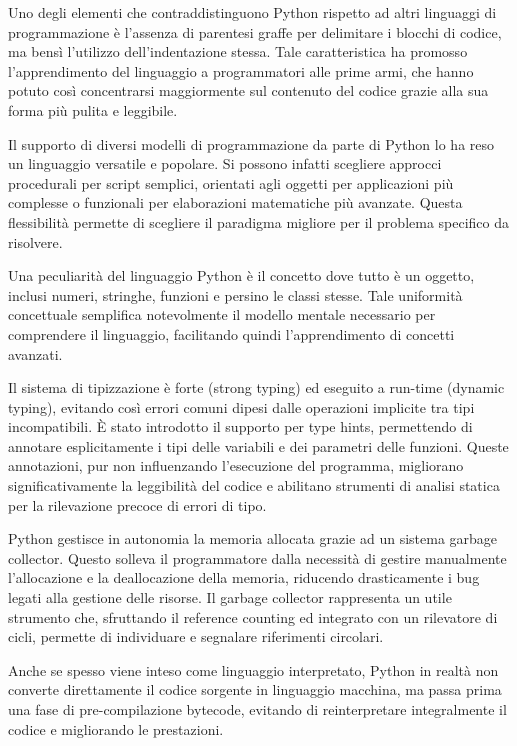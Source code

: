 Uno degli elementi che contraddistinguono Python rispetto ad altri linguaggi di programmazione è l'assenza di parentesi
graffe per delimitare i blocchi di codice, ma bensì l'utilizzo dell'indentazione stessa. Tale caratteristica ha promosso
l'apprendimento del linguaggio a programmatori alle prime armi, che hanno potuto così concentrarsi maggiormente sul
contenuto del codice grazie alla sua forma più pulita e leggibile.

Il supporto di diversi modelli di programmazione da parte di Python lo ha reso un linguaggio versatile e popolare.
Si possono infatti scegliere approcci procedurali per script semplici, orientati agli oggetti per applicazioni più
complesse o funzionali per elaborazioni matematiche più avanzate. Questa flessibilità permette di scegliere il paradigma
migliore per il problema specifico da risolvere.

Una peculiarità del linguaggio Python è il concetto dove tutto è un oggetto, inclusi numeri, stringhe,
funzioni e persino le classi stesse. Tale uniformità concettuale semplifica notevolmente il modello mentale necessario
per comprendere il linguaggio, facilitando quindi l'apprendimento di concetti avanzati.

Il sistema di tipizzazione è forte (strong typing) ed eseguito a run-time (dynamic typing), evitando così errori comuni
dipesi dalle operazioni implicite tra tipi incompatibili. È stato introdotto il supporto per type hints, permettendo
di annotare esplicitamente i tipi delle variabili e dei parametri delle funzioni. Queste annotazioni, pur non
influenzando l'esecuzione del programma, migliorano significativamente la leggibilità del codice e abilitano strumenti
di analisi statica per la rilevazione precoce di errori di tipo.

Python gestisce in autonomia la memoria allocata grazie ad un sistema garbage collector.
Questo solleva il programmatore dalla necessità di gestire manualmente l'allocazione e la deallocazione della memoria,
riducendo drasticamente i bug legati alla gestione delle risorse. Il garbage collector rappresenta un utile strumento
che, sfruttando il reference counting ed integrato con un rilevatore di cicli, permette di individuare e segnalare
riferimenti circolari.

Anche se spesso viene inteso come linguaggio interpretato, Python in realtà non converte direttamente
il codice sorgente in linguaggio macchina, ma passa prima una fase di pre-compilazione bytecode, evitando di
reinterpretare integralmente il codice e migliorando le prestazioni.

